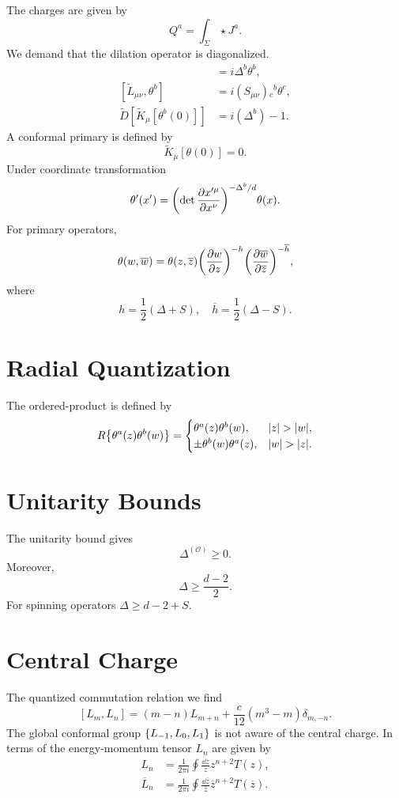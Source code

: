 \documentclass{article}
\begin{document}
The charges are given by
\[ Q^a = \int_\Sigma \star J^a. \]
We demand that the dilation operator is diagonalized.
\begin{align*}
    [\tilde{D}, \theta^b(0)] &= i \Delta^b \theta^b, \\
    [\tilde{L}_{\mu\nu}, \theta^b] &= i(S_{\mu\nu}){_c}{^b} \theta^c, \\
    \tilde{D}[\tilde{K}_\mu[\theta^b(0)]] &= i(\Delta^b) - 1.
\end{align*}
A conformal primary is defined by
\[ \tilde{K}_\mu[\theta(0)] = 0. \]
Under coordinate transformation
\[ \theta'(x') = \qty(\det \pdv{x'^\mu}{x^\nu})^{-\Delta^b/d}\theta(x). \]
For primary operators,
\[ \theta(w,\overline{w}) = \theta(z,\overline{z}) \qty(\pdv{w}{z})^{-h}\qty(\pdv{\overline{w}}{\overline{z}})^{-\overline{h}}, \]
where
\[ h = \frac{1}{2} (\Delta + S),\quad \overline{h} = \frac{1}{2}(\Delta - S). \]

\section{Radial Quantization}

The ordered-product is defined by
\[ R\qty{\theta^a(z) \theta^b(w)} = \begin{cases}
    \theta^a(z) \theta^b(w), & \abs{z} > \abs{w}, \\
    \pm \theta^b(w) \theta^a(z), & \abs{w} > \abs{z}.
\end{cases} \]

\section{Unitarity Bounds}

The unitarity bound gives
\[ \Delta^{(\mathcal{O})} \ge 0. \]
Moreover,
\[ \Delta \ge \frac{d - 2}{2}. \]
For spinning operators $\Delta \ge d - 2 + S$.

\section{Central Charge}

The quantized commutation relation we find
\[ [L_m,L_n] = (m-n)L_{m+n} + \frac{c}{12}(m^3 - m)\delta_{m,-n}. \]
The global conformal group $\qty{L_{-1},L_0,L_1}$ is not aware of the central charge.
In terms of the energy-momentum tensor $L_n$ are given by
\begin{align*}
    L_n &= \frac{1}{2\pi i} \oint \frac{\dd{z}}{z} z^{n+2} T(z), \\
    \overline{L}_n &= \frac{1}{2\pi i} \oint \frac{\dd{\overline{z}}}{\overline{z}} \overline{z}^{n+2} T(\overline{z}).
\end{align*}
\end{document}
